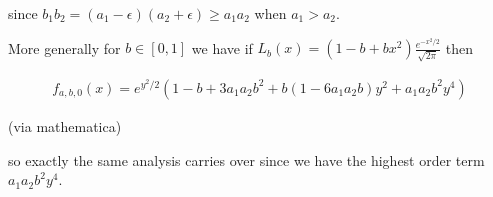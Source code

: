 \documentclass[11pt]{article}
\theoremstyle{remark}
\begin{document}
since $b_1b_2 = (a_1-\epsilon)(a_2 + \epsilon) \geq a_1a_2$ when $a_1 > a_2$. 

More generally for $b \in [0,1]$ we have if $L_b(x) = (1-b+bx^2)\frac{e^{-x^2/2}}{\sqrt{2 \pi}}$ then 

\begin{align*}
	f_{a,b,0}(x) = e^{y^2/2}(1-b+3a_1a_2b^2 + b(1-6a_1a_2b)y^2 + a_1a_2 b^2y^4)
\end{align*}

(via mathematica)

so exactly the same analysis carries over since we have the highest order term $a_1a_2b^2y^4$. 
\end{document}
